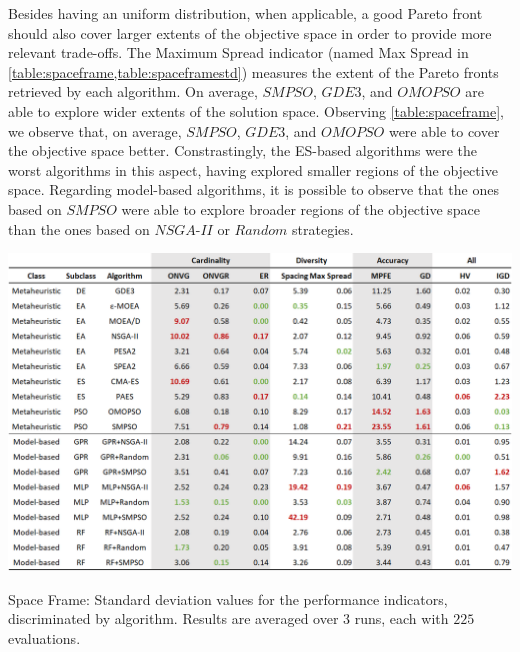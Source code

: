 Besides having an uniform distribution, when applicable, a good Pareto front should also cover larger extents of the objective space in order to provide more relevant trade-offs. The Maximum Spread indicator (named Max Spread in \cref{table:spaceframe,table:spaceframestd}) measures the extent of the Pareto fronts retrieved by each algorithm. On average, $SMPSO$, $GDE3$, and $OMOPSO$ are able to explore wider extents of the solution space. Observing \cref{table:spaceframe}, we observe that, on average, $SMPSO$, $GDE3$, and $OMOPSO$ were able to cover the objective space better. Constrastingly, the \ac{ES}-based algorithms were the worst algorithms in this aspect, having explored smaller regions of the objective space. Regarding model-based algorithms, it is possible to observe that the ones based on $SMPSO$ were able to explore broader regions of the objective space than the ones based on $NSGA$-$II$ or $Random$ strategies. 

\begin{table}[h!]
	\centering
	\includegraphics[width=\textwidth]{Images/Evaluation/caadria/Results_Std_20190416.PNG}
	\caption[Space Frame: Standard deviations of the performance indicators results, discriminated by each algorithm]{Space Frame: Standard deviation values for the performance indicators, discriminated by algorithm. Results are averaged over $3$ runs, each with $225$ evaluations.}
	\label{table:spaceframestd}
\end{table}

